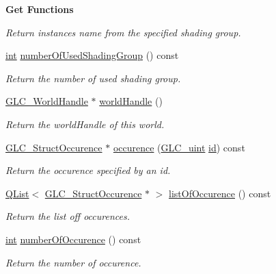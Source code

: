 \begin{Indent}{\bf Get Functions}
\begin{DoxyCompactItemize}
\begin{DoxyCompactList}\small\item\em Return instances name from the specified shading group. \end{DoxyCompactList}\item 
\hyperlink{ioapi_8h_a787fa3cf048117ba7123753c1e74fcd6}{int} \hyperlink{class_g_l_c___world_a68250937ef2b963039fc579c9bb1c5b2}{number\-Of\-Used\-Shading\-Group} () const 
\begin{DoxyCompactList}\small\item\em Return the number of used shading group. \end{DoxyCompactList}\item 
\hyperlink{class_g_l_c___world_handle}{G\-L\-C\-\_\-\-World\-Handle} $\ast$ \hyperlink{class_g_l_c___world_a99e88797ac1b946e34f677765034f818}{world\-Handle} ()
\begin{DoxyCompactList}\small\item\em Return the world\-Handle of this world. \end{DoxyCompactList}\item 
\hyperlink{class_g_l_c___struct_occurence}{G\-L\-C\-\_\-\-Struct\-Occurence} $\ast$ \hyperlink{class_g_l_c___world_ad06e360852d2f76f00ec5aa5affa1f11}{occurence} (\hyperlink{glc__global_8h_abf950976fabed69026558df8e2da6c6b}{G\-L\-C\-\_\-uint} \hyperlink{glext_8h_a58c2a664503e14ffb8f21012aabff3e9}{id}) const 
\begin{DoxyCompactList}\small\item\em Return the occurence specified by an id. \end{DoxyCompactList}\item 
\hyperlink{class_q_list}{Q\-List}$<$ \hyperlink{class_g_l_c___struct_occurence}{G\-L\-C\-\_\-\-Struct\-Occurence} $\ast$ $>$ \hyperlink{class_g_l_c___world_a8b77a6db75aff3cca9287e23dddca487}{list\-Of\-Occurence} () const 
\begin{DoxyCompactList}\small\item\em Return the list off occurences. \end{DoxyCompactList}\item 
\hyperlink{ioapi_8h_a787fa3cf048117ba7123753c1e74fcd6}{int} \hyperlink{class_g_l_c___world_a4b292bfe2ebb09010c48cfaa6b7d756c}{number\-Of\-Occurence} () const 
\begin{DoxyCompactList}\small\item\em Return the number of occurence. \end{DoxyCompactList}\item 

\end{DoxyCompactItemize}
\end{Indent}
